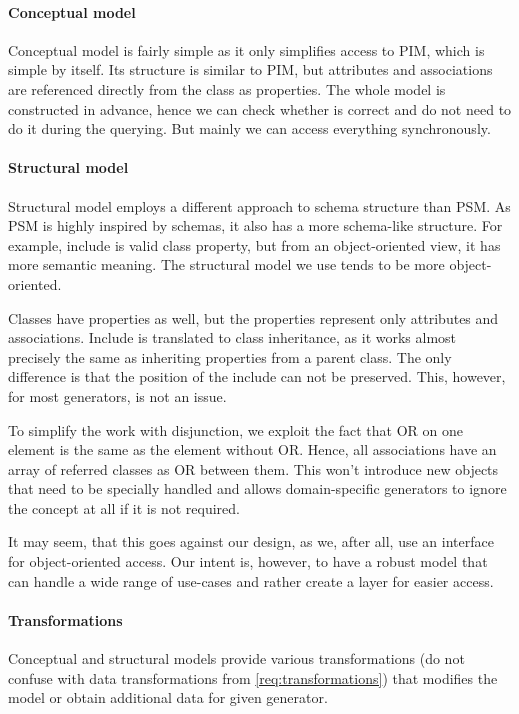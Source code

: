 \paragraph{Conceptual model} Conceptual model is fairly simple as it only simplifies access to PIM, which is simple by itself. Its structure is similar to PIM, but attributes and associations are referenced directly from the class as properties. The whole model is constructed in advance, hence we can check whether is correct and do not need to do it during the querying. But mainly we can access everything synchronously.

\paragraph{Structural model} Structural model employs a different approach to schema structure than PSM. As PSM is highly inspired by schemas, it also has a more schema-like structure. For example, include is valid class property, but from an object-oriented view, it has more semantic meaning. The structural model we use tends to be more object-oriented.

Classes have properties as well, but the properties represent only attributes and associations. Include is translated to class inheritance, as it works almost precisely the same as inheriting properties from a parent class. The only difference is that the position of the include can not be preserved. This, however, for most generators, is not an issue.

To simplify the work with disjunction, we exploit the fact that OR on one element is the same as the element without OR. Hence, all associations have an array of referred classes as OR between them. This won't introduce new objects that need to be specially handled and allows domain-specific generators to ignore the concept at all if it is not required.

It may seem, that this goes against our design, as we, after all, use an interface for object-oriented access. Our intent is, however, to have a robust model that can handle a wide range of use-cases and rather create a layer for easier access.

\paragraph{Transformations} Conceptual and structural models provide various transformations (do not confuse with data transformations from \autoref{req:transformations}) that modifies the model or obtain additional data for given generator.

